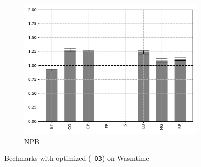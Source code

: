 \begin{figure}
\begin{subfigure}[t]{.45\textwidth}
        \includegraphics[width=\textwidth]
        {Images/6.1.RQ1/npb-wasmtime-opt.pdf}
        \caption{NPB}
    \end{subfigure}
    \caption{Bechmarks with optimized (\texttt{-O3}) on Wasmtime}
    \label{fig:rq1-wasmtime-opt}
\end{figure}


